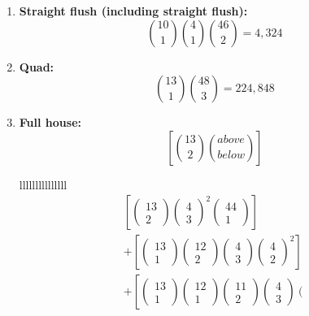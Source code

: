 \documentclass{article}
\begin{document}
\begin{enumerate}
    \item \textbf{Straight flush (including straight flush):}
    \[
        \binom{10}{1} \binom{4}{1} \binom{46}{2} 
        = 4,324
    \]
    \item \textbf{Quad:} 
    \[
        \binom{13}{1} \binom{48}{3} 
        = 224,848
    \]
    \item \textbf{Full house:}
    \[
        \left[ \binom{13}{2} \binom{above}{below} \right]
    \]

    lllllllllllllll
    \[
        \begin{aligned}
& {\left[\left(\begin{array}{c}
13 \\
2
\end{array}\right)\left(\begin{array}{l}
4 \\
3
\end{array}\right)^2\left(\begin{array}{c}
44 \\
1
\end{array}\right)\right]} \\
& +\left[\left(\begin{array}{c}
13 \\
1
\end{array}\right)\left(\begin{array}{c}
12 \\
2
\end{array}\right)\left(\begin{array}{l}
4 \\
3
\end{array}\right)\left(\begin{array}{l}
4 \\
2
\end{array}\right)^2\right] \\
& +\left[\left(\begin{array}{c}
13 \\
1
\end{array}\right)\left(\begin{array}{c}
12 \\
1
\end{array}\right)\left(\begin{array}{c}
11 \\
2
\end{array}\right)\left(\begin{array}{l}
4 \\
3
\end{array}\right)\left(\begin{array}{l}

\end{array}
\end{aligned}\]
\end{enumerate}
\end{document}
